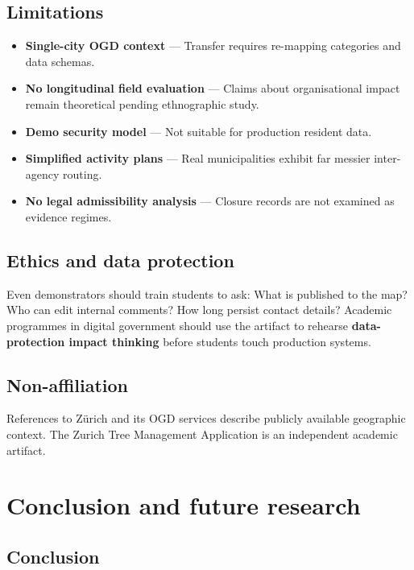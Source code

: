 \documentclass[12pt,a4paper]{article}
\newcommand{\appname}{Zurich Tree Management Application}
\begin{document}
\subsection{Limitations}

\begin{itemize}
    \item \textbf{Single-city OGD context} --- Transfer requires re-mapping categories and data schemas.
    \item \textbf{No longitudinal field evaluation} --- Claims about organisational impact remain theoretical pending ethnographic study.
    \item \textbf{Demo security model} --- Not suitable for production resident data.
    \item \textbf{Simplified activity plans} --- Real municipalities exhibit far messier inter-agency routing.
    \item \textbf{No legal admissibility analysis} --- Closure records are not examined as evidence regimes.
\end{itemize}

\subsection{Ethics and data protection}

Even demonstrators should train students to ask: What is published to the map? Who can edit internal comments? How long persist contact details? Academic programmes in digital government should use the artifact to rehearse \textbf{data-protection impact thinking} before students touch production systems.

\subsection{Non-affiliation}

References to Zürich and its OGD services describe publicly available geographic context. The \appname{} is an independent academic artifact.

\section{Conclusion and future research}
\label{sec:conclusion}

\subsection{Conclusion}
\end{document}
